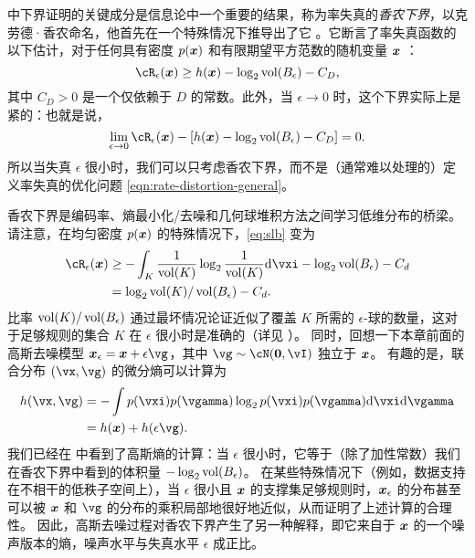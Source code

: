 \documentclass[../../book-main_zh.tex]{subfiles}
\begin{document}
\begin{remark}\label{rem:slb}
	 中下界证明的关键成分是信息论中一个重要的结果，称为率失真的\textit{香农下界}，以克劳德·香农命名，他首先在一个特殊情况下推导出了它 \cite{shannon1959coding}。它断言了率失真函数的以下估计，对于任何具有密度 $p(\bm{x})$ 和有限期望平方范数的随机变量 \(\bm{x}\) \cite{Linder1994-ej}：
	\begin{equation}\label{eq:slb}
		\cR_{\epsilon}(\x)
		\geq
		h(\x)
		- \log_2 \volume(B_{\epsilon})
		-
		C_D,
	\end{equation}
	其中 $C_D > 0$ 是一个仅依赖于 \(D\) 的常数。此外，当 \(\epsilon \to 0\) 时，这个下界实际上是紧的：也就是说，
	\begin{equation}
		\lim_{\epsilon \to 0} \cR_{\epsilon}(\x) - \left[ h(\x) - \log_2
		\volume(B_{\epsilon}) - C_D\right] = 0.
	\end{equation}
	所以当失真 \(\epsilon\) 很小时，我们可以只考虑香农下界，而不是（通常难以处理的）定义率失真的优化问题 \eqref{eqn:rate-distortion-general}。

	香农下界是编码率、熵最小化/去噪和几何球堆积方法之间学习低维分布的桥梁。请注意，在均匀密度 \(p(\bm{x})\) 的特殊情况下，\eqref{eq:slb} 变为
	\begin{align}
		\cR_{\epsilon}(\x) &\geq -\int_K \frac{1}{\volume(K)} \log_2
		\frac{1}{\volume(K)} \odif \vxi
		- \log_2 \volume(B_{\epsilon}) - C_d
		\\
		&=
		\log_2 \volume(K) / \volume(B_{\epsilon})
		- C_d. \label{eq:shannon-lower-bound-uniform}
	\end{align}
	比率 \(\operatorname{vol}(K) / \operatorname{vol}(B_{\epsilon})\) 通过最坏情况论证近似了覆盖 \(K\) 所需的 \(\epsilon\)-球的数量，这对于足够规则的集合 \(K\) 在 \(\epsilon\) 很小时是准确的（详见 ）。
	同时，回想一下本章前面的高斯去噪模型 \(\x_{\epsilon} = \x + \epsilon \vg\)，其中 \(\vg \sim \cN(\Zero, \vI)\) 独立于 \(\bm{x}\)。
	有趣的是，联合分布 \((\vx, \vg)\) 的微分熵可以计算为
	\begin{align}
		h(\vx, \vg)
		&=
		-\int
		p(\vxi) p(\vgamma) \log_2 p(\vxi) p(\vgamma) \odif \vxi \odif \vgamma
		\\
		&=
		h(\x) + h(\epsilon \vg).
	\end{align}
	我们已经在  中看到了高斯熵的计算：当 \(\epsilon\) 很小时，它等于（除了加性常数）我们在香农下界中看到的体积量 \(-\log_2 \operatorname{vol}(B_{\epsilon})\)。
	在某些特殊情况下（例如，数据支持在不相干的低秩子空间上），当 \(\epsilon\) 很小且 \(\bm{x}\) 的支撑集足够规则时，\(\bm{x}_{\epsilon}\) 的分布甚至可以被 \(\bm{x}\) 和 \(\vg\) 的分布的乘积局部地很好地近似，从而证明了上述计算的合理性。
	因此，高斯去噪过程对香农下界产生了另一种解释，即它来自于 \(\bm{x}\) 的一个噪声版本的熵，噪声水平与失真水平 \(\epsilon\) 成正比。



\end{remark}
\end{document}
